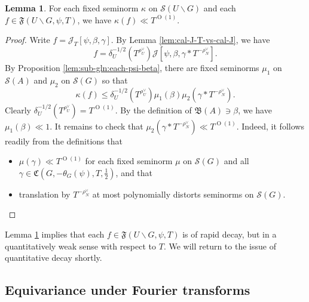 \documentclass[reqno]{amsart}
\def\O{\operatorname{O}}
\theoremstyle{plain} \newtheorem{theorem} {Theorem}
\theoremstyle{definition} \newtheorem{definition} [theorem] {Definition}
\theoremstyle{itplain} %
\newtheorem{lemma}[theorem]{Lemma}
\numberwithin{equation}{section}
\numberwithin{theorem}{section}
\renewcommand{\leq}{\leqslant}
\begin{document}
\begin{lemma}\label{lem:scratch-research:each-fixed-seminorm}
  For each fixed seminorm $\kappa$ on $\mathcal{S}(U \backslash G)$ and each $f \in \mathfrak{F}(U \backslash G, \psi, T)$, we have $\kappa(f) \ll T^{\O(1)}$.
\end{lemma}
\begin{proof}
  Write $f = \mathcal{J}_T[\psi,\beta,\gamma]$.  By Lemma \ref{lem:cal-J-T-vs-cal-J}, we have
  \begin{equation*}
    f = \delta_U^{-1/2}(T^{\rho_U^\vee}) \mathcal{J}[\psi,\beta, \gamma \ast T^{-\rho_N^\vee}].
  \end{equation*}
  By Proposition \ref{lem:sub-gln:each-psi-beta}, there are fixed seminorms $\mu_1$ on $\mathcal{S}(A)$ and $\mu_2$ on $\mathcal{S}(G)$ so that
  \begin{equation*}
\kappa(f) \leq \delta_U^{-1/2}(T^{\rho_U^\vee}) \mu_1(\beta) \mu_2(\gamma \ast T^{-\rho_N^\vee}).
\end{equation*}
Clearly $\delta_U^{-1/2}(T^{\rho_U^\vee}) = T^{\O(1)}$.  By the definition of $\mathfrak{B}(A) \ni \beta$, we have $\mu_1(\beta) \ll 1$.  It remains to check that $\mu_2(\gamma \ast T^{-\rho_N^\vee}) \ll T^{\O(1)}$.  Indeed, it follows readily from the definitions that
  \begin{itemize}
  \item  $\mu(\gamma) \ll T^{\O(1)}$ for each fixed seminorm $\mu$ on $\mathcal{S}(G)$ and all $\gamma \in \mathfrak{C}(G,-\theta_G(\psi),T,\tfrac{1}{2})$, and that
  \item  translation by $T^{-\rho_N^\vee}$ at most polynomially distorts seminorms on $\mathcal{S}(G)$.
  \end{itemize}
\end{proof}
Lemma \ref{lem:scratch-research:each-fixed-seminorm} implies that each $f \in \mathfrak{F}(U \backslash G, \psi, T)$ is of rapid decay, but in a quantitatively weak sense with respect to $T$.  We will return to the issue of quantitative decay shortly.




\subsection{Equivariance under Fourier transforms}
\end{document}
